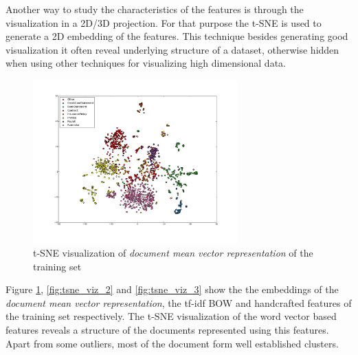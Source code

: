 Another way to study  the characteristics of the features   is through the
visualization in a 2D/3D projection. For that purpose the \ac{t-SNE} is used
to generate a 2D embedding of the features. This technique besides generating
good visualization it often reveal underlying structure of a dataset,
otherwise hidden when using other techniques for visualizing high dimensional
data.

\begin{figure}[ht!]
	\begin{center}

			\includegraphics[width=0.7\textwidth]{images/tse-document-mean-vectors.pdf} 

	\end{center}
	\caption{\ac{t-SNE} visualization of \textit{document mean
           vector representation} of the training set}
	\label{fig:tsne_viz_1}
\end{figure}

Figure \ref{fig:tsne_viz_1}, \ref{fig:tsne_viz_2} and \ref{fig:tsne_viz_3}
show the the embeddings of the \textit{document mean vector representation},
the \ac{tf-idf} \ac{BOW}  and handcrafted features of the training set
respectively. The \ac{t-SNE} visualization of the word vector  based features
reveals a structure of the documents represented using this features. Apart from some outliers, most of the document form
well established clusters.


